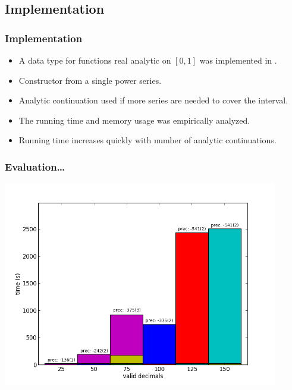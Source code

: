 
\subsection{Implementation}
\begin{frame}[<+->]
\frametitle{Implementation}
\begin{itemize}
    \item A data type for functions real analytic on $[0,1]$ was implemented in \irram .
    \item Constructor from a single power series.
    \item Analytic continuation used if more series are needed to cover the interval. 
    \item The running time and memory usage was empirically analyzed.
    \item Running time increases quickly with number of analytic continuations. 
\end{itemize}
\end{frame}
\begin{frame}
  \frametitle{Evaluation\dots}
  \includegraphics[width=0.9\textwidth]{sin_for_series_4_dep_on_n}
\end{frame}
